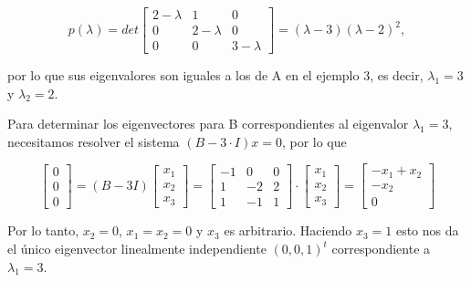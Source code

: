 \documentclass[12pt, a4paper]{article}
\numberwithin{subsection}{section} %
\begin{document}
            $$p(\lambda) = det\begin{bmatrix}
                                2-\lambda & 1 & 0 \\
                                0 & 2-\lambda & 0 \\
                                0 & 0 & 3-\lambda
                            \end{bmatrix} = (\lambda  - 3)(\lambda  - 2)^2,$$
        
            por lo que sus eigenvalores son iguales a los de A en el ejemplo 3, es decir, $\lambda_1 = 3$ y $\lambda_2 = 2$.
            
            Para determinar los eigenvectores para B correspondientes al eigenvalor $\lambda_1 = 3$, necesitamos
            resolver el sistema $(B - 3\cdot I)x = 0$, por lo que
        
            \begin{equation*}
                \begin{bmatrix}
                    0 \\ 0 \\ 0
                \end{bmatrix} = (B - 3I)
                \begin{bmatrix}
                    x_1 \\ x_2 \\ x_3
                \end{bmatrix} =
                \begin{bmatrix}
                    -1 & 0 & 0 \\
                    1 & -2 & 2 \\
                    1 & -1 & 1
                \end{bmatrix}  \cdot 
                \begin{bmatrix}
                    x_1 \\ x_2 \\ x_3
                \end{bmatrix} =
                \begin{bmatrix}
                    -x_1 + x_2 \\ -x_2 \\ 0
                \end{bmatrix}
            \end{equation*}
        
            Por lo tanto, $x_2 = 0$, $x_1 = x_2 = 0$ y $x_3$ es arbitrario. Haciendo $x_3 = 1$ esto nos da el único eigenvector linealmente independiente $(0, 0, 1)^t$ correspondiente a $\lambda_1 = 3$.
        
\end{document}
